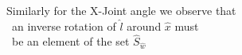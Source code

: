 \documentclass[preview]{standalone}
\begin{document}
\begin{center}
Similarly for the X-Joint angle we observe that\\ \
                      an inverse rotation of $\hat l$ around $\hat x$ must\\ \
                      be an element of the set $\hat S_{\hat w}$
\end{center}
\end{document}

